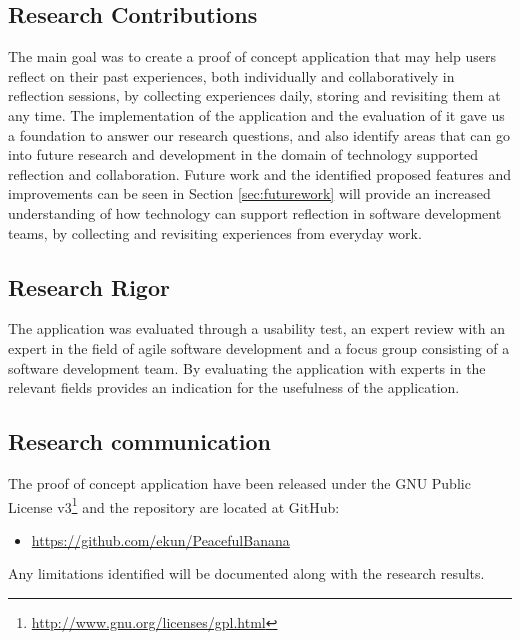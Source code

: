 \subsection{Research Contributions}
The main goal was to create a proof of concept application that may help users reflect on their past experiences, both individually and collaboratively in reflection sessions, by collecting experiences daily, storing and revisiting them at any time. The implementation of the application and the evaluation of it gave us a foundation to answer our research questions, and also identify areas that can go into future research and development in the domain of technology supported reflection and collaboration. 
Future work  and the identified proposed features and improvements can be seen in Section \ref{sec:futurework}
 will provide an increased understanding of how technology can support reflection in software development teams, by collecting and revisiting experiences from everyday work. 

\subsection{Research Rigor}
The application was evaluated through a usability test, an expert review with an expert in the field of agile software development and a focus group consisting of a software development team. By evaluating the application with experts in the relevant fields provides an indication for the usefulness of the application.

\clearpage
\subsection{Research communication}
The proof of concept application have been released under the GNU Public License v3\footnote{\url{http://www.gnu.org/licenses/gpl.html}} and the repository are located at GitHub: 
\begin{itemize}
	\item \url{https://github.com/ekun/PeacefulBanana}
\end{itemize} 
Any limitations identified  will be documented along with the research results. 



